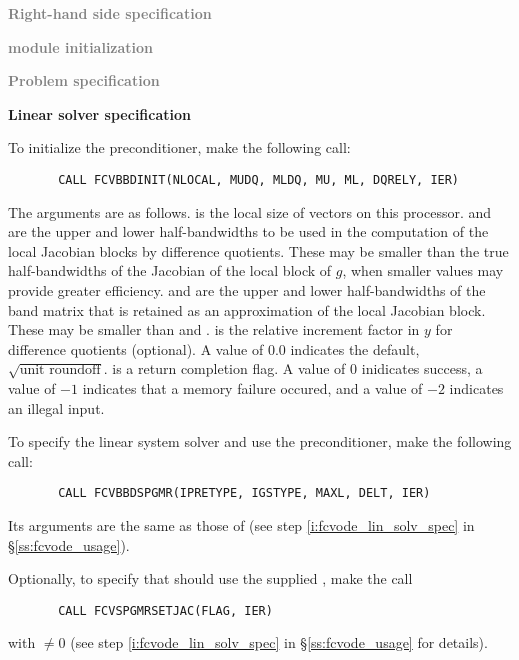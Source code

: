 \begin{Steps}
  
\item \textcolor{gray}{\bf Right-hand side specification}

\item \textcolor{gray}{\bf {\nvector} module initialization}

\item \textcolor{gray}{\bf Problem specification}

\item {\bf Linear solver specification}

  To initialize the {\cvbbdpre} preconditioner, make the following call:
\begin{verbatim}
       CALL FCVBBDINIT(NLOCAL, MUDQ, MLDQ, MU, ML, DQRELY, IER)
\end{verbatim}
  The arguments are as follows.
   is the local size of vectors on this processor.
   and  are the upper and lower half-bandwidths to be used in 
  the computation of the local Jacobian blocks by difference quotients.
  These may be smaller than the true half-bandwidths of the
  Jacobian of the local block of $g$, when smaller values may
  provide greater efficiency.
   and  are the upper and lower half-bandwidths of the band matrix that 
  is retained as an approximation of the local Jacobian block.
  These may be smaller than  and .
   is the relative increment factor in $y$ for difference quotients (optional). 
  A value of $0.0$ indicates the default, $\sqrt{\text{unit roundoff}}$.
   is a return completion flag.  A value of $0$ inidicates success, a value of
  $-1$ indicates that a memory failure occured, and a value of $-2$ indicates an 
  illegal input.
  
  To specify the {\spgmr} linear system solver and use the {\cvbbdpre}
  preconditioner, make the following call:
\begin{verbatim}
       CALL FCVBBDSPGMR(IPRETYPE, IGSTYPE, MAXL, DELT, IER)
\end{verbatim}
  Its arguments are the same as those of 
  (see step \ref{i:fcvode_lin_solv_spec} in \S\ref{ss:fcvode_usage}).
  

  Optionally, to specify that {\spgmr} should use the supplied , 
  make the call
\begin{verbatim}
       CALL FCVSPGMRSETJAC(FLAG, IER)
\end{verbatim}
  with $\neq 0$ 
  (see step \ref{i:fcvode_lin_solv_spec} in \S\ref{ss:fcvode_usage} for details).
  

\end{Steps}
